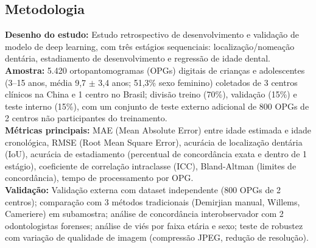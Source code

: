 \subsection{Metodologia}
\textbf{Desenho do estudo:} Estudo retrospectivo de desenvolvimento e
validação de modelo de deep learning, com três estágios sequenciais:
localização/nomeação dentária, estadiamento de desenvolvimento e
regressão de idade dental. \\
\textbf{Amostra:} 5.420 ortopantomogramas (OPGs) digitais de crianças
e adolescentes (3--15 anos, média 9,7 $\pm$ 3,4 anos; 51,3\% sexo
feminino) coletados de 3 centros clínicos na China e 1 centro no
Brasil; divisão treino (70\%), validação (15\%) e teste interno
(15\%), com um conjunto de teste externo adicional de 800 OPGs de
2 centros não participantes do treinamento. \\
\textbf{Métricas principais:} MAE (Mean Absolute Error) entre idade
estimada e idade cronológica, RMSE (Root Mean Square Error), acurácia
de localização dentária (IoU), acurácia de estadiamento (percentual
de concordância exata e dentro de 1 estágio), coeficiente de
correlação intraclasse (ICC), Bland-Altman (limites de concordância),
tempo de processamento por OPG. \\
\textbf{Validação:} Validação externa com dataset independente
(800 OPGs de 2 centros); comparação com 3 métodos tradicionais
(Demirjian manual, Willems, Cameriere) em subamostra; análise de
concordância interobservador com 2 odontologistas forenses; análise
de viés por faixa etária e sexo; teste de robustez com variação de
qualidade de imagem (compressão JPEG, redução de resolução).

